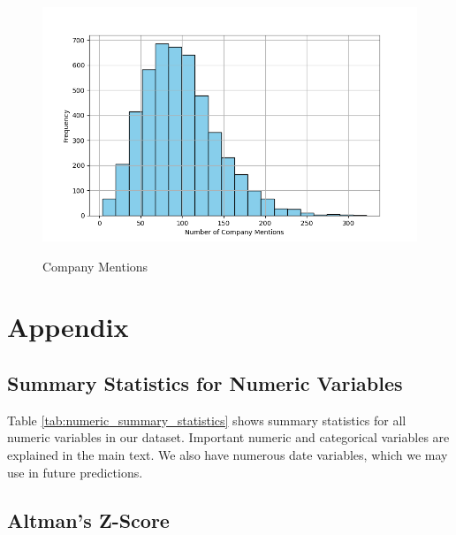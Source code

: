 \documentclass{article}[11pt]
\begin{document}
    \begin{figure}[h!]
		\centering
        \caption{Company Mentions}
        \includegraphics[width=0.5\linewidth,keepaspectratio=true]{../Output/All Data EDA/NLP EDA - NER on Company Names/Company Mentions Distribution No Title.png}
        \label{fig:company-mentions}
	\end{figure}
    
    \clearpage
    \newpage

    
    

    \clearpage
    \newpage

    \appendix

    \section{Appendix}

    \subsection{Summary Statistics for Numeric Variables}

    Table \ref{tab:numeric_summary_statistics} shows summary statistics for all numeric variables in our dataset. Important numeric and categorical variables are explained in the main text. We also have numerous date variables, which we may use in future predictions.

    

    \subsection{Altman's Z-Score}

    \label{sec:altman-z-score}
\end{document}
